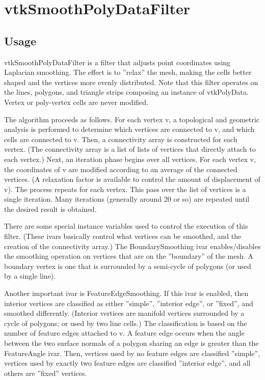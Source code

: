 \section{vtkSmoothPolyDataFilter}

\subsection{Usage}

 vtkSmoothPolyDataFilter is a filter that adjusts point coordinates using 
 Laplacian smoothing. The effect is to ''relax'' the mesh, making the cells 
 better shaped and the vertices more evenly distributed. Note that this
 filter operates on the lines, polygons, and triangle strips composing an
 instance of vtkPolyData. Vertex or poly-vertex cells are never modified.
 
 The algorithm proceeds as follows. For each vertex v, a topological and
 geometric analysis is performed to determine which vertices are connected
 to v, and which cells are connected to v. Then, a connectivity array is
 constructed for each vertex. (The connectivity array is a list of lists
 of vertices that directly attach to each vertex.) Next, an iteration
 phase begins over all vertices. For each vertex v, the coordinates of v
 are modified according to an average of the connected vertices.  (A
 relaxation factor is available to control the amount of displacement of
 v).  The process repeats for each vertex. This pass over the list of
 vertices is a single iteration. Many iterations (generally around 20 or
 so) are repeated until the desired result is obtained.
 
 There are some special instance variables used to control the execution
 of this filter. (These ivars basically control what vertices can be
 smoothed, and the creation of the connectivity array.) The
 BoundarySmoothing ivar enables/disables the smoothing operation on
 vertices that are on the ''boundary'' of the mesh. A boundary vertex is one
 that is surrounded by a semi-cycle of polygons (or used by a single
 line).
 
 Another important ivar is FeatureEdgeSmoothing. If this ivar is
 enabled, then interior vertices are classified as either ''simple'',
 ''interior edge'', or ''fixed'', and smoothed differently. (Interior
 vertices are manifold vertices surrounded by a cycle of polygons; or used
 by two line cells.) The classification is based on the number of feature 
 edges attached to v. A feature edge occurs when the angle between the two
 surface normals of a polygon sharing an edge is greater than the
 FeatureAngle ivar. Then, vertices used by no feature edges are classified
 ''simple'', vertices used by exactly two feature edges are classified
 ''interior edge'', and all others are ''fixed'' vertices.


